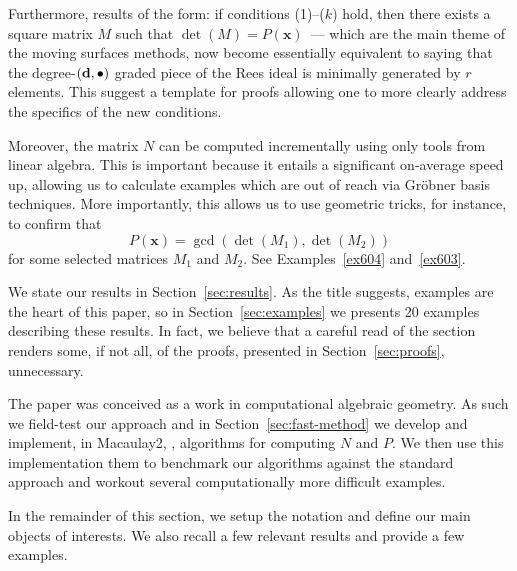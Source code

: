 \documentclass[fleqn,reqno]{amsart}
\begin{document}
\begin{paragraf*}
Furthermore, results of the form:
if conditions (1)--($k$) hold,
then there exists a square matrix $M$ such that $\det(M)=P(\mathbf x)$~---
which are the main theme of the moving surfaces methods,
now become essentially equivalent to saying that the degree-$(\mathbf d,\bullet)$ graded piece
of the Rees ideal is minimally generated by $r$ elements.
This suggest a template for proofs allowing one to more clearly
address the specifics of the new conditions.

Moreover, the matrix $N$ can be computed incrementally
using only tools from linear algebra.
This is important because it entails a significant on-average speed up,
allowing us to calculate examples which are out of reach via Gr\"obner basis techniques.
More importantly, this allows us to use geometric tricks, for instance,
to confirm that
\[
	P(\mathbf x)=\gcd(\det(M_1),\det(M_2))
\]
for some selected matrices $M_1$ and $M_2$.
See Examples~\ref{ex604} and~\ref{ex603}.
\end{paragraf*}

\begin{paragraf*}
We state our results in Section~\ref{sec:results}.
As the title suggests, examples are the heart of this paper,
so in Section~\ref{sec:examples} we presents 20 examples describing these results.
In fact, we believe that a careful read of the section renders some, if not all,
of the proofs, presented in Section~\ref{sec:proofs}, unnecessary.

The paper was conceived as a work in computational algebraic geometry.
As such we field-test our approach and in Section~\ref{sec:fast-method}
we develop and implement, in Macaulay2, \citet{M2},
algorithms for computing $N$ and $P$.
We then use this implementation them to benchmark our algorithms against the standard approach
and workout several computationally more difficult examples.
\end{paragraf*}

\begin{paragraf*}
In the remainder of this section,
we setup the notation and define our main objects of interests.
We also recall a few relevant results and provide a few examples.
\end{paragraf*}
\end{document}
